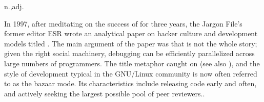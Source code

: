  n.,adj.

In 1997, after meditating on the success of  for three
years, the Jargon File's former editor ESR wrote an analytical paper on hacker
culture and development models titled .
The main argument of the paper was that  is not the whole
story; given the right social machinery, debugging can be efficiently
parallelized across large numbers of programmers. The title metaphor caught on
(see also ), and the style of development typical in the
GNU/Linux community is now often referred to as the bazaar mode. Its
characteristics include releasing code early and often, and actively seeking the
largest possible pool of peer reviewers..


